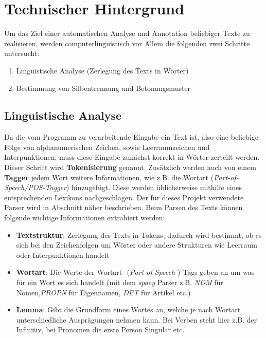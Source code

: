 \section{Technischer Hintergrund}

Um das Ziel einer automatischen Analyse und Annotation beliebiger Texte zu realisieren, werden computerlinguistisch vor Allem die folgenden zwei Schritte untersucht:
\begin{enumerate}
	\item Linguistische Analyse (Zerlegung des Texts in Wörter)
	\item Bestimmung von Silbentrennung und Betonungsmuster
\end{enumerate}

\subsection{Linguistische Analyse}
Da die vom Programm zu verarbeitende Eingabe ein Text ist, also eine beliebige Folge von alphanumerischen Zeichen, sowie Leerraumzeichen und Interpunktionen, muss diese Eingabe zunächst korrekt in Wörter zerteilt werden. Dieser Schritt wird \textbf{Tokenisierung} genannt. Zusätzlich werden auch von einem \textbf{Tagger} jedem Wort weitere Informationen, wie z.B. die Wortart (\textit{Part-of-Speech/POS-Tagger}) hinzugefügt. Diese werden üblicherweise mithilfe eines entsprechenden Lexikons nachgeschlagen. \cite{Carstensen2009} Der für dieses Projekt verwendete Parser wird in Abschnitt  näher beschrieben. Beim Parsen des Texts können folgende wichtige Informationen extrahiert werden:

\begin{itemize}
	\item \textbf{Textstruktur}: Zerlegung des Texts in Tokens, dadurch wird bestimmt, ob es sich bei den Zeichenfolgen um Wörter oder andere Strukturen wie Leerraum oder Interpunktionen handelt
	
	\item \textbf{Wortart}: Die Werte der Wortart- (\textit{Part-of-Speech-}) Tags geben an um was für ein Wort es sich handelt (mit dem \textit{spacy} Parser z.B. \textit{NOM} für Nomen,\textit{PROPN} für Eigennamen, \textit{DET} für Artikel etc.)
	
	\item  \textbf{Lemma}: Gibt die Grundform eines Wortes an, welche je nach Wortart unterschiedliche Ausprägungen nehmen kann. Bei Verben steht hier z.B. der Infinitiv, bei Pronomen die erste Person Singular etc. 
\end{itemize}

